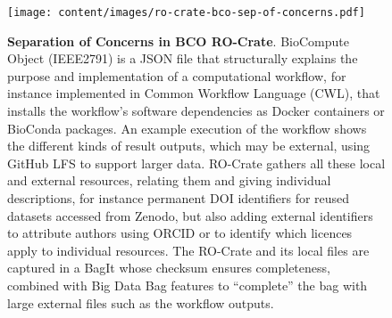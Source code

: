 \begin{figure}[t]
    \centering
    \texttt{[image: content/images/ro-crate-bco-sep-of-concerns.pdf]}
    \caption{\textbf{Separation of Concerns in BCO RO-Crate}. BioCompute Object (IEEE2791) is a JSON file that structurally explains the purpose and implementation of a computational workflow, for instance implemented in Common Workflow Language (CWL), that installs the workflow’s software dependencies as Docker containers or BioConda packages. An example execution of the workflow shows the different kinds of result outputs, which may be external, using GitHub LFS \cite{github-lfs} to support larger data. RO-Crate gathers all these local and external resources, relating them and giving individual descriptions, for instance permanent DOI identifiers for reused datasets accessed from Zenodo, but also adding external identifiers to attribute authors using ORCID or to identify which licences apply to individual resources. The RO-Crate and its local files are captured in a BagIt whose checksum ensures completeness, combined with Big Data Bag \cite{doi:10.1109/BigData.2016.7840618} features to “complete” the bag with large external files such as the workflow outputs.}
    \label{fig:sep_concerns}
\end{figure}
